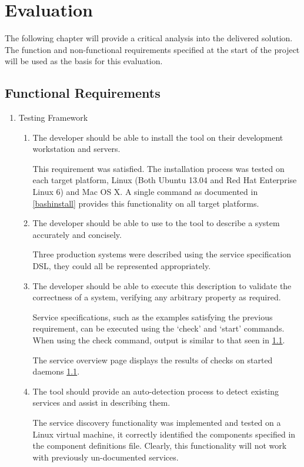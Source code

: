 \documentclass{cshonours}
\begin{document}
\chapter{Evaluation}

The following chapter will provide a critical analysis into the delivered solution. The function and non-functional requirements specified at the start of the project will be used as the basis for this evaluation.

\section{Functional Requirements}
\begin{enumerate}
  \item Testing Framework
    \begin{enumerate}
      \item The developer should be able to install the tool on their development workstation and servers.

        This requirement was satisfied. The installation process was tested on each target platform, Linux (Both Ubuntu 13.04 and Red Hat Enterprise Linux 6) and Mac OS X. A single command as documented in \autoref{bashinstall} provides this functionality on all target platforms.

      \item The developer should be able to use to the tool to describe a system accurately and concisely.

        Three production systems were described using the service specification DSL, they could all be represented appropriately.

      \item The developer should be able to execute this description to validate the correctness of a system, verifying any arbitrary property as required.

        Service specifications, such as the examples satisfying the previous requirement, can be executed using the `check' and `start' commands. When using the check command, output is similar to that seen in \ref{}.

        The service overview page displays the results of checks on started daemons \ref{}.

      \item The tool should provide an auto-detection process to detect existing services and assist in describing them.

        The service discovery functionality was implemented and tested on a Linux virtual machine, it correctly identified the components specified in the component definitions file. Clearly, this functionality will not work with previously un-documented services.


\end{enumerate}
\end{enumerate}
\end{document}
